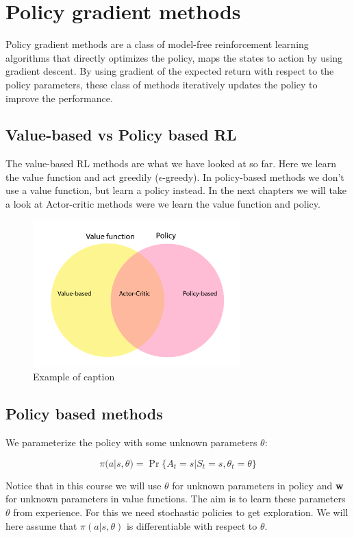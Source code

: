
\section{Policy gradient methods}
Policy gradient methods are a class of model-free reinforcement learning algorithms that directly optimizes the policy, maps the states to action by using gradient descent. By using gradient of the expected return with respect to the policy parameters, these class of methods iteratively updates the policy to improve the performance. 

\subsection{Value-based vs Policy based RL}
The value-based RL methods are what we have looked at so far. Here we learn the value function and act greedily ($\epsilon$-greedy). In policy-based methods we don't use a value function, but learn a policy instead. In the next chapters we will take a look at Actor-critic methods were we learn the value function and policy.

\begin{figure}[ht!]
\centering
\includegraphics[width=80mm]{figures/valuepolicy.pdf}
\caption{Example of caption}
\label{fig:example}
\end{figure}


\subsection{Policy based methods}
We parameterize the policy with some unknown parameters $\theta$:

	\begin{equation}
	 	\pi (a|s, \theta) = \Pr \{A_t = s | S_t = s, \theta_t = \theta \}
	 \end{equation} 

Notice that in this course we will use $\theta$ for unknown parameters in policy and \textbf{w} for unknown parameters in value functions. The aim is to learn these parameters $\theta$ from experience. For this we need stochastic policies to get exploration. We will here assume that $\pi (a|s,\theta)$ is differentiable with respect to $\theta$. 

